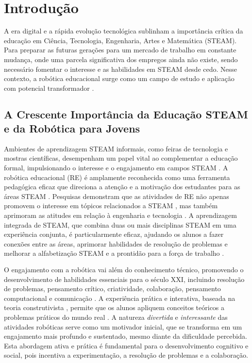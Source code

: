 \documentclass[%
  a4paper,%
  12pt,%
  fleqn,%
  english,%
  brazilian,%
]{article}
\begin{document}
% 

\section{Introdução}%
\label{sect:intro}
A era digital e a rápida evolução tecnológica sublinham a importância crítica da educação em Ciência, Tecnologia, Engenharia, Artes e Matemática (STEAM). Para preparar as futuras gerações para um mercado de trabalho em constante mudança, onde uma parcela significativa dos empregos ainda não existe, sendo necessário fomentar o interesse e as habilidades em STEAM desde cedo. Nesse contexto, a robótica educacional surge como um campo de estudo e aplicação com potencial transformador \cite{meegleYouthRobotics2025}.

\subsection{A Crescente Importância da Educação STEAM e da Robótica para Jovens}
Ambientes de aprendizagem STEAM informais, como feiras de tecnologia e mostras científicas, desempenham um papel vital ao complementar a educação formal, impulsionando o interesse e o engajamento em campos STEAM \cite{ross2024BeyondExhibits}. A robótica educacional (RE) é amplamente reconhecida como uma ferramenta pedagógica eficaz que direciona a atenção e a motivação dos estudantes para as áreas STEAM \cite{cheung2024SummerLibraries}. Pesquisas demonstram que as atividades de RE não apenas promovem o interesse em tópicos relacionados a STEAM \cite{ross2024BeyondExhibits}, mas também aprimoram as atitudes em relação à engenharia e tecnologia \cite{cheung2024SummerLibraries}. A aprendizagem integrada de STEAM, que combina duas ou mais disciplinas STEAM em uma experiência conjunta, é particularmente eficaz, ajudando os alunos a fazer conexões entre as áreas, aprimorar habilidades de resolução de problemas e melhorar a alfabetização STEAM e a prontidão para a força de trabalho \cite{ross2024BeyondExhibits}.

O engajamento com a robótica vai além do conhecimento técnico, promovendo o desenvolvimento de habilidades essenciais para o século XXI, incluindo resolução de problemas, pensamento crítico, criatividade, colaboração, pensamento computacional e comunicação \cite{meegleYouthRobotics2025}. A experiência prática e interativa, baseada na teoria construtivista \cite{ross2024BeyondExhibits}, permite que os alunos apliquem conceitos teóricos a problemas práticos do mundo real \cite{meegleYouthRobotics2025}. A natureza \emph{divertida} e \emph{interessante} das atividades robóticas \cite{cheung2024SummerLibraries} serve como um motivador inicial, que se transforma em um engajamento mais profundo e sustentado, mesmo diante da dificuldade percebida. Esta abordagem ativa e prática é fundamental para o desenvolvimento cognitivo e social, pois incentiva a experimentação, a resolução de problemas e a colaboração.
\end{document}
